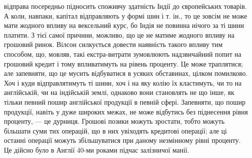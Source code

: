 відправа посередньо підносить споживчу здатність Індії до європейських товарів.
А коли, навпаки, капітал відправляють у формі шин і т. ін., то це зовсім не
може мати жодного впливу на вексельний курс, бо Індія не повинна нічого за
ті шини платити. З тієї самої причини, можливо, що це не матиме жодного
впливу на грошовий ринок. Вілсон силкується довести наявність такого впливу
тим способом, що, мовляв, такі екстра-витрати зумовлюють надзвичайний попит
на грошовий кредит і тому впливатимуть на рівень проценту. Це може траплятися;
але запевняти, що це мусить відбуватися в усяких обставинах, цілком
помилково. Хоч і куди відправлятимуть ті шини, хоч і на яку колію їх кластимуть,
чи то на англійській, чи на індійській землі, однаково вони становлять
не що інше, як тільки певний пошир англійської продукції в певній сфері. Запевняти,
що пошир продукції, навіть у дуже широких межах, не може відбутись
без піднесення рівня проценту, — це дурниця. Грошові позики можуть зростати,
тобто можуть більшати суми тих операцій, що в них увіходять кредитові
операції; але ці останні операції можуть збільшуватися при даному незмінному
рівні проценту. Це дійсно було в Англії 40-ми роками підчас залізничої манії.
